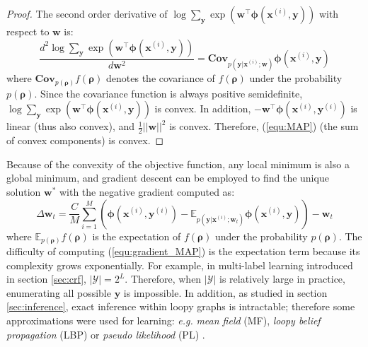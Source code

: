 \begin{proof}
    The second order derivative of $\log \sum_{\mathbf{y}} \exp(\mathbf{w}^\top \boldsymbol{\phi}(\mathbf{x}^{(i)},\mathbf{y}))$ with respect to 
    $\mathbf{w}$ is:
    \begin{equation}
    \frac{d^2 \log \sum_{\mathbf{y}} \exp(\mathbf{w}^\top \boldsymbol{\phi}(\mathbf{x}^{(i)},\mathbf{y}))}{d \mathbf{w}^2}=\mathbf{Cov}_{p(\mathbf{y}|\mathbf{x}^{(i)};\mathbf{w})}\boldsymbol{\phi}(\mathbf{x}^{(i)},\mathbf{y})
    \end{equation}
    where $\mathbf{Cov}_{p(\boldsymbol{\rho})}f(\boldsymbol{\rho})$ denotes the covariance of $f(\boldsymbol{\rho})$ under the probability $p(\boldsymbol{\rho})$. 
    Since the covariance function is always positive semidefinite, $\log \sum_{\mathbf{y}} \exp(\mathbf{w}^\top \boldsymbol{\phi}(\mathbf{x}^{(i)},\mathbf{y}))$ is convex. In addition, 
    $-\mathbf{w}^\top \boldsymbol{\phi}(\mathbf{x}^{(i)},\mathbf{y}^{(i)})$ is linear (thus also convex), and $\frac{1}{2} ||\mathbf{w}||^2$ is convex. Therefore, 
    (\ref{equ:MAP}) (the sum of convex components) is convex.  
\end{proof}
Because of the convexity of the objective function, any local minimum is also a global minimum, and gradient descent can be employed to find the unique solution 
$\mathbf{w}^*$ with the negative gradient computed as: 
\begin{equation}
    \Delta \mathbf{w}_t=\frac{C}{M}\sum_{i=1}^M(\boldsymbol{\phi}(\mathbf{x}^{(i)},\mathbf{y}^{(i)})-\mathbb{E}_{p(\mathbf{y}|\mathbf{x}^{(i)};\mathbf{w}_t)} \boldsymbol{\phi}(\mathbf{x}^{(i)},\mathbf{y}))-\mathbf{w}_t 
\label{equ:gradient_MAP}
\end{equation}
where $\mathbb{E}_{p(\boldsymbol{\rho})}f(\boldsymbol{\rho})$ is the expectation of $f(\boldsymbol{\rho})$ under the probability $p(\boldsymbol{\rho})$.
The difficulty of computing (\ref{equ:gradient_MAP}) is the expectation term because its complexity grows exponentially. For example, in multi-label 
learning introduced in section \ref{sec:crf}, $|\mathcal{Y}|=2^L$. 
Therefore, when $|\mathcal{Y}|$ is relatively large in practice, enumerating all possible $\mathbf{y}$ is impossible. 
In addition, as studied in section \ref{sec:inference}, exact inference within loopy graphs is intractable; therefore some approximations were used for learning: 
\emph{e.g.} \emph{mean field} (MF), \emph{loopy belief propagation} (LBP) or \emph{pseudo likelihood} (PL) \citep{LBP, Kumar03,CRF,Accelerated_CRF}.  



